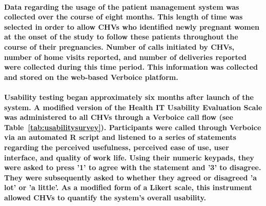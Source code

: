 \paragraph{Data regarding the usage of the patient management system  was collected over the course of eight months. This length of time was selected in order to allow CHVs who identified newly pregnant women at the onset of the study to follow these patients throughout the course of their pregnancies. Number of calls initiated by CHVs, number of home visits reported, and number of deliveries reported were collected during this time period. This information was collected and stored on the web-based Verboice platform.}

\paragraph{Usability testing began approximately six months after launch of the system. A modified version of the Health IT Usability Evaluation Scale \citep{Yen2010} was administered to all CHVs through a Verboice call flow (see Table~\ref{tab:usabilitysurvey}). Participants were called through Verboice via an automated R script and listened to a series of statements regarding the perceived usefulness, perceived ease of use, user interface, and quality of work life. Using their numeric keypads, they were asked to press '1' to agree with the statement and '3' to disagree. They were subsequently asked to whether they agreed or disagreed 'a lot' or 'a little'. As a modified form of a Likert scale, this instrument allowed CHVs to quantify the system's overall usability.}



